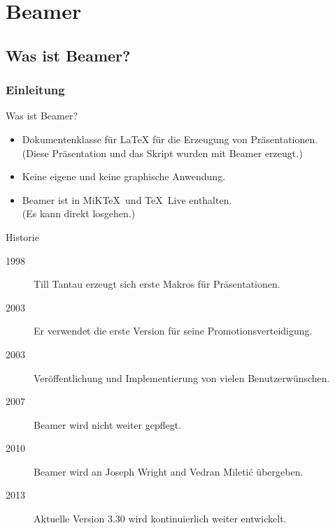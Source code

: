 \chapter{Beamer}


\website

\section{Was ist Beamer?}

\subsection{Einleitung}

\begin{Frame}{Was ist Beamer?}
  \begin{itemize}
    \item \alert{Dokumentenklasse für \LaTeX} für die Erzeugung von Präsentationen.\\
      (Diese Präsentation und das Skript wurden mit Beamer erzeugt.)
    \item Keine eigene und \alert{keine graphische Anwendung}.
    \item Beamer ist in MiK\TeX\ und \TeX\ Live enthalten.\\
      (\alert{Es kann direkt losgehen}.)
  \end{itemize}
\end{Frame}

\begin{Frame}{Historie}
  \begin{description}
    \item[1998] Till Tantau erzeugt sich erste Makros für Präsentationen.
    \item[2003] Er verwendet die erste Version für seine Promotionsverteidigung.
    \item[2003] Veröffentlichung und Implementierung von vielen Benutzerwünschen.
    \item[2007] Beamer wird nicht weiter gepflegt.
    \item[2010] Beamer wird an Joseph Wright and Vedran Mileti\'c übergeben.
    \item[2013] Aktuelle Version 3.30 wird kontinuierlich weiter entwickelt.
  \end{description}
\end{Frame}

